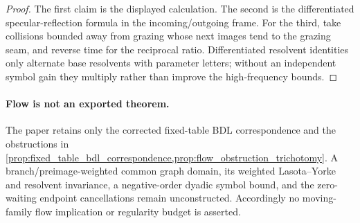 \documentclass[11pt]{amsart}
\theoremstyle{compactplain}
\theoremstyle{compactdefinition}
\theoremstyle{compactremark}
\begin{document}
\begin{proof}
The first claim is the displayed calculation.  The second is the
differentiated specular-reflection formula in the incoming/outgoing frame.  For
the third, take collisions bounded away from grazing whose next images tend to
the grazing seam, and reverse time for the reciprocal ratio.  Differentiated
resolvent identities only alternate base resolvents with parameter letters;
without an independent symbol gain they multiply rather than improve the
high-frequency bounds.
\end{proof}

\paragraph{Flow is not an exported theorem.}
The paper retains only the corrected fixed-table BDL correspondence and the
obstructions in \cref{prop:fixed_table_bdl_correspondence,prop:flow_obstruction_trichotomy}.
A branch/preimage-weighted common graph domain, its weighted Lasota--Yorke and
resolvent invariance, a negative-order dyadic symbol bound, and the
zero-waiting endpoint cancellations remain unconstructed.  Accordingly no
moving-family flow implication or regularity budget is asserted.
\end{document}
